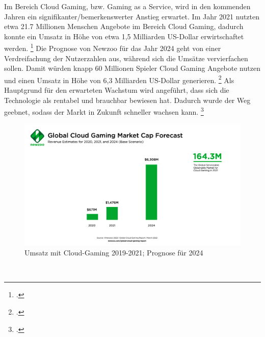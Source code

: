 \documentclass[12pt,toc=bib,toc=listof]{scrreprt}
\begin{document}
Im Bereich Cloud Gaming, bzw. Gaming as a Service, wird in den kommenden Jahren ein signifikanter/bemerkenswerter
 Anstieg erwartet. Im Jahr 2021 nutzten etwa 21.7 Millionen Menschen Angebote im Bereich Cloud Gaming, dadurch konnte ein
 Umsatz in Höhe von etwa 1,5 Milliarden US-Dollar erwirtschaftet werden. \footcite [Vgl.] [] {Fernandes.2022} Die Prognose von Newzoo für das Jahr 
 2024 geht von einer Verdreifachung der Nutzerzahlen aus, während sich die Umsätze vervierfachen sollen. Damit würden knapp 60
 Millionen Spieler Cloud Gaming Angebote nutzen und einen Umsatz in Höhe von 6,3 Milliarden US-Dollar generieren. \footcite [Vgl.] [] {Fernandes.2022}
  Als Hauptgrund für den erwarteten Wachstum wird angeführt, dass sich die Technologie als rentabel und brauchbar bewiesen hat. Dadurch wurde der Weg geebnet, sodass 
 der Markt in Zukunft schneller wachsen kann. \footcite [Vgl.] [] {Newzoo.2022}
\\%
\begin{figure}[h]
 \centering
  \includegraphics[scale=0.12]{Abbildungen/Newzoo_Global_Cloud_Gaming_Market_Cap_Forecast_March2022.png} 
  \caption[Newzoo 2022]{Umsatz mit Cloud-Gaming 2019-2021; Prognose für 2024}
\end{figure}
\\%
\end{document}
